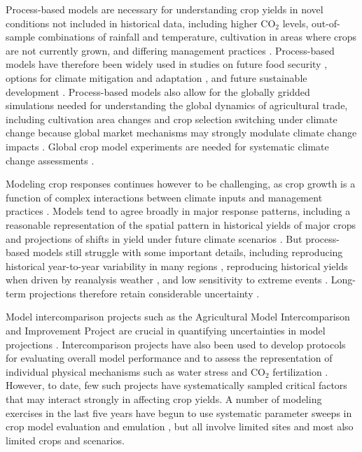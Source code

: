 \documentclass[gmd, manuscript]{copernicus} %
\begin{document}
Process-based models are necessary for understanding crop yields in novel conditions not included in historical data, including higher CO$_2$ levels, out-of-sample combinations of rainfall and temperature, cultivation in areas where crops are not currently grown, and differing management practices \citep[e.g.][]{pugh_climate_2016, Roberts2017,minoli2019modelling}. Process-based models have therefore been widely used in studies on future food security \citep{wheeler2013climate, Elliott14, frieler2017assessing}, options for climate mitigation \citep{muller2015} and adaptation \citep{challinor2018improving}, and future sustainable development \citep{humpenoder2018large, jagermeyr_reconciling_2017}.
Process-based models also allow for the globally gridded simulations needed for understanding the global dynamics of agricultural trade, including cultivation area changes and crop selection switching under climate change \citep{rosenzweig2018,ruane2018} because global market mechanisms may strongly modulate climate change impacts \citep{Stevanovic2016,hasegawa2018risk}. 
Global crop model experiments are needed for systematic climate change assessments \citep{muller_global_2017}.

Modeling crop responses continues however to be challenging, as crop growth is a function of complex interactions between climate inputs and management practices \citep{Boote13,rotter2011}. 
Models tend to agree broadly in major response patterns, including a reasonable representation of the spatial pattern in historical yields of major crops and projections of shifts in yield under future climate scenarios \citep[e.g.][]{Elliott2015, muller_global_2017}. 
But process-based models still struggle with some important details, including reproducing historical year-to-year variability in many regions \citep[e.g.][]{muller_global_2017, Jag2018}, reproducing historical yields when driven by reanalysis weather \citep[e.g.][]{Glotter14}, and low sensitivity to extreme events \citep[e.g.][]{Glotter15,schewe2019}. 
Long-term projections therefore retain considerable uncertainty \citep{WOLF2002217, JAGTAP200273, Iizumi2010, ANGULO201332, Asseng2013, Asseng2015}. 

Model intercomparison projects such as the Agricultural Model Intercomparison and Improvement Project \citep[AgMIP, ][]{ROSENZWEIG2013} are crucial in quantifying uncertainties in model projections \citep{Rosenzweig2014}. Intercomparison projects have also been used to develop protocols for evaluating overall model performance \citep{Elliott2015, muller_global_2017} and to assess the representation of individual physical mechanisms such as water stress and CO$_2$ fertilization \citep[e.g.][]{Schauberger2017}.
However, to date, few such projects have systematically sampled critical factors that may interact strongly in affecting crop yields. A number of modeling exercises in the last five years have begun to use
systematic parameter sweeps in crop model evaluation and emulation  \citep[e.g.][]{ruane2014, Markowski2015, Pirttioja2015,FRONZEK20182, Snyder2018, RUIZRAMOS2018}, but all involve limited sites and most also limited crops and scenarios. 
\end{document}
